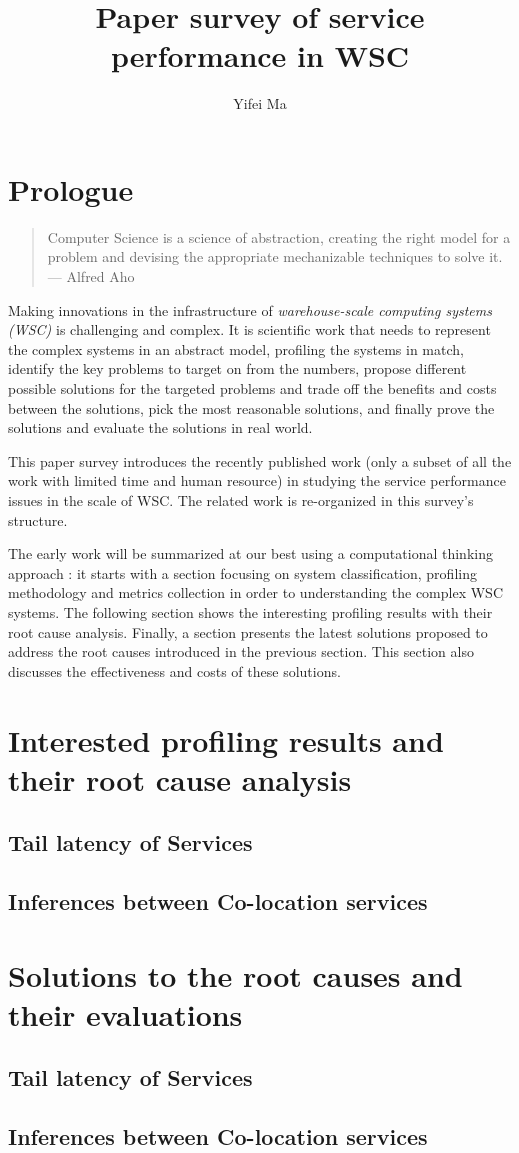 \documentclass[
  journal=small,
  manuscript=article-type,  %
  year=2020,
  volume=37,
]{cup-journal}
\title{Paper survey of service performance in WSC}
\author{Yifei Ma}
\affiliation{Bytedance}
\begin{document}
\section{Prologue}
\begin{quote}
Computer Science is a science of abstraction, creating the right model for a problem and devising the appropriate mechanizable techniques to solve it.  \linebreak[2]
--- Alfred Aho
\end{quote}
Making innovations in the infrastructure of \textit{warehouse-scale computing systems (WSC)} is challenging and complex. It is scientific work that needs to represent the complex systems in an abstract model, profiling the systems in match, identify the key problems to target on from the numbers, propose different possible solutions for the targeted problems and trade off the benefits and costs between the solutions, pick the most reasonable solutions, and finally prove the solutions and evaluate the solutions in real world.

This paper survey introduces the recently published work (only a subset of all the work with limited time and human resource) in studying the service performance issues in the scale of WSC. The related work is re-organized in this survey's structure.

The early work will be summarized at our best using a computational thinking approach \autocite{DBLP:journals/cacm/Wing06}: it starts with a section focusing on system classification, profiling methodology and metrics collection in order to understanding the complex WSC systems. The following section shows the interesting profiling results with their root cause analysis. Finally, a section presents the latest solutions proposed to address the root causes introduced in the previous section. This section also discusses the effectiveness and costs of these solutions.



\section{Interested profiling results and their root cause analysis}
\subsection{Tail latency of Services}

\subsection{Inferences between Co-location services}

\pagebreak

\section{Solutions to the root causes and their evaluations}
\subsection{Tail latency of Services}

\subsection{Inferences between Co-location services}

\pagebreak
\printbibliography
\end{document}
